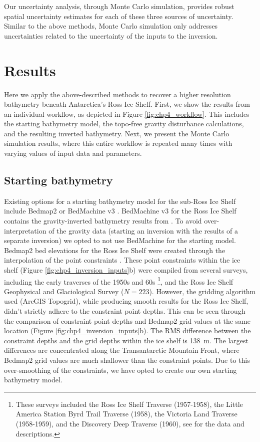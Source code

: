 Our uncertainty analysis, through Monte Carlo simulation, provides robust spatial uncertainty estimates for each of these three sources of uncertainty. Similar to the above methods, Monte Carlo simulation only addresses uncertainties related to the uncertainty of the inputs to the inversion.

\section{Results}

Here we apply the above-described methods to recover a higher resolution bathymetry beneath Antarctica's Ross Ice Shelf. First, we show the results from an individual workflow, as depicted in Figure \ref{fig:chp4_workflow}. This includes the starting bathymetry model, the topo-free gravity disturbance calculations, and the resulting inverted bathymetry. Next, we present the Monte Carlo simulation results, where this entire workflow is repeated many times with varying values of input data and parameters.\\

\subsection{Starting bathymetry}

Existing options for a starting bathymetry model for the sub-Ross Ice Shelf include Bedmap2 \citep{fretwellbedmap22013} or BedMachine v3 \citep{morlighemdeep2020, morlighemmeasures2022}. BedMachine v3 for the Ross Ice Shelf contains the gravity-inverted bathymetry results from \citet{tintoross2019}. To avoid over-interpretation of the gravity data (starting an inversion with the results of a separate inversion) we opted to not use BedMachine for the starting model. Bedmap2 bed elevations for the Ross Ice Shelf were created through the interpolation of the point constraints \citep{fretwellbedmap22013}. These point constraints within the ice shelf (Figure \ref{fig:chp4_inversion_inputs}b) were compiled from several surveys, including the early traverses of the 1950s and 60s \citep{craryglaciological1962,  craryoversnow1959,craryoversnow1962}\footnote{These surveys included the Ross Ice Shelf Traverse (1957-1958), the Little America Station Byrd Trail Traverse (1958), the Victoria Land Traverse (1958-1959), and the Discovery Deep Traverse (1960), see \citet{bennettgravity1964} for the data and descriptions.}, and the Ross Ice Shelf Geophysical and Glaciological Survey \citep[RIGGS, 1973-1974][]{bentleyross1984} ($N=223$). However, the gridding algorithm used (ArcGIS Topogrid), while producing smooth results for the Ross Ice Shelf, didn't strictly adhere to the constraint point depths. This can be seen through the comparison of constraint point depths and Bedmap2 grid values at the same location (Figure \ref{fig:chp4_inversion_inputs}b). The RMS difference between the constraint depths and the grid depths within the ice shelf is 138~m. The largest differences are concentrated along the Transantarctic Mountain Front, where Bedmap2 grid values are much shallower than the constraint points. Due to this over-smoothing of the constraints, we have opted to create our own starting bathymetry model.\\

